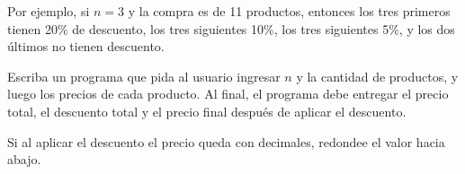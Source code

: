 \documentclass[11pt,spanish]{article}
\begin{document}
\begin{enumerate}[font=\Large\bfseries]
\begin{minipage}[t]{.55\textwidth}
        Por ejemplo,
        si \(n = 3\) y la compra es de 11 productos,
        entonces los tres primeros tienen 20\% de descuento,
        los tres siguientes 10\%,
        los tres siguientes 5\%,
        y los dos últimos no tienen descuento.
        \vspace{1ex}

        Escriba un programa que pida al usuario ingresar \(n\)
        y la cantidad de productos,
        y luego los precios de cada producto.
        Al final,
        el programa debe entregar el precio total,
        el descuento total
        y el precio final después de aplicar el descuento.
        \vspace{1ex}

        Si al aplicar el descuento el precio queda con decimales,
        redondee el valor hacia abajo.
      \end{minipage}
      \hfill
      \begin{minipage}[t]{.35\textwidth}
        
      \end{minipage}

  \end{enumerate}
\end{document}
